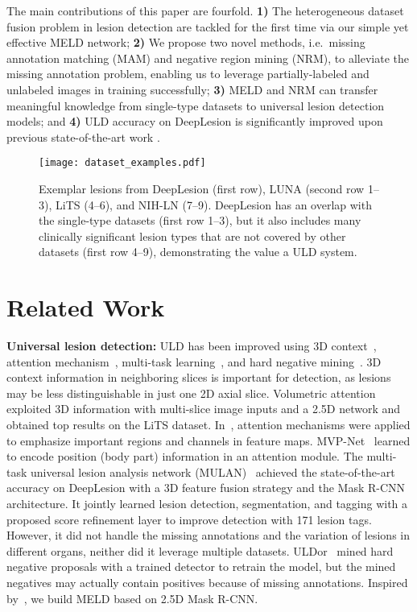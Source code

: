 \documentclass[runningheads]{llncs}
\def\ie{{i.e.}}
\begin{document}
The main contributions of this paper are fourfold. \textbf{1)} The heterogeneous dataset fusion problem in lesion detection are tackled for the first time via our simple yet effective MELD network; \textbf{2)} We propose two novel methods, \ie~missing annotation matching (MAM) and negative region mining (NRM), to alleviate the missing annotation problem, enabling us to leverage  partially-labeled and unlabeled images in training successfully; \textbf{3)} MELD and NRM can transfer meaningful knowledge from single-type datasets to universal lesion detection models; and \textbf{4)} ULD accuracy on DeepLesion \cite{Yan2018DeepLesion} is significantly improved upon previous state-of-the-art work \cite{Yan2019MULAN}.

\begin{figure}[t]
	\centering
	\texttt{[image: dataset\_examples.pdf]} \caption{Exemplar lesions from DeepLesion (first row), LUNA (second row 1--3), LiTS (4--6), and NIH-LN (7--9). DeepLesion has an overlap with the single-type datasets (first row 1--3), but it also includes many clinically significant lesion types that are not covered by other datasets (first row 4--9), demonstrating the value a ULD system.}
	\label{fig:dataset_examples} \vspace{-3mm}
\end{figure}

\section{Related Work}
\label{sec:rel_work}

{\bf Universal lesion detection:} ULD has been improved using 3D context~\cite{Yan20183DCE,Yan2019MULAN,Wang2019LiTS}, attention mechanism~\cite{Wang2019universal,Zlocha2019retina,Li2019MVP,Wang2019LiTS}, multi-task learning~\cite{Yan2019MULAN,Wang2019universal}, and hard negative mining~\cite{Tang2019Uldor}. 3D context information in neighboring slices is important for detection, as lesions may be less distinguishable in just one 2D axial slice. Volumetric attention~\cite{Wang2019LiTS} exploited 3D information with multi-slice image inputs and a 2.5D network and obtained top results on the LiTS dataset. In~\cite{Zlocha2019retina,Li2019MVP,Wang2019LiTS}, attention mechanisms were applied to emphasize important regions and channels in feature maps. MVP-Net~\cite{Li2019MVP} learned to encode position (body part) information in an attention module. The multi-task universal lesion analysis network (MULAN)~\cite{Yan2019MULAN} achieved the state-of-the-art accuracy on DeepLesion with a 3D feature fusion strategy and the Mask R-CNN~\cite{He2017MaskRCNN} architecture. It jointly learned lesion detection, segmentation, and tagging with a proposed score refinement layer to improve detection with 171 lesion tags. However, it did not handle the missing annotations and the variation of lesions in different organs, neither did it leverage multiple datasets. ULDor~\cite{Tang2019Uldor} mined hard negative proposals with a trained detector to retrain the model, but the mined negatives may actually contain positives because of missing annotations. Inspired by~\cite{Yan2019MULAN,Wang2019LiTS}, we build MELD based on 2.5D Mask R-CNN.
\end{document}
